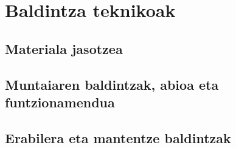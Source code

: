 %

\section{Baldintza teknikoak}

\subsection{Materiala jasotzea}

\subsection{Muntaiaren baldintzak, abioa eta funtzionamendua}

\subsection{Erabilera eta mantentze baldintzak}
